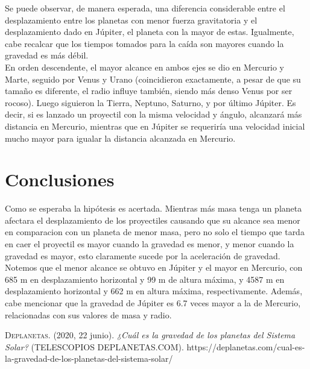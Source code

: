 \documentclass{article}
\begin{document}
Se puede observar, de manera esperada, una diferencia considerable entre el desplazamiento entre los planetas con menor fuerza gravitatoria y el desplazamiento dado en J\'upiter, el planeta con la mayor de estas. Igualmente, cabe recalcar que los tiempos tomados para la ca\'ida son mayores cuando la gravedad es m\'as d\'ebil.
\\
En orden descendente, el mayor alcance en ambos ejes se dio en Mercurio y Marte, seguido por Venus y Urano (coincidieron exactamente, a pesar de que su tamaño es diferente, el radio influye también, siendo más denso Venus por ser rocoso). Luego siguieron la Tierra, Neptuno, Saturno, y por último Júpiter. Es decir, si es lanzado un proyectil con la misma velocidad y ángulo, alcanzará más distancia en Mercurio, mientras que en Júpiter se requeriría una velocidad inicial mucho mayor para igualar la distancia alcanzada en Mercurio.

\section{Conclusiones}
Como se esperaba la hip\'otesis es acertada. Mientras más masa tenga un planeta afectara el desplazamiento de los proyectiles causando que su alcance sea menor en comparacion con un planeta de menor masa, pero no solo el tiempo que tarda en caer el proyectil es mayor cuando la gravedad es menor, y menor cuando la gravedad es mayor, esto claramente sucede por la aceleración de gravedad.\\
Notemos que el menor alcance se obtuvo en J\'upiter y el mayor en Mercurio, con 685 m en desplazamiento horizontal y 99 m de altura máxima, y 4587 m en desplazamiento horizontal y 662 m en altura m\'axima, respectivamente. Además, cabe mencionar que la gravedad de J\'upiter es 6.7 veces mayor a la de Mercurio, relacionadas con sus valores de masa y radio.

\begin{thebibliography}{X}
   \textsc{Deplanetas}. (2020, 22 junio).
\textit{¿Cuál es la gravedad de los planetas del Sistema Solar?} (TELESCOPIOS DEPLANETAS.COM). https://deplanetas.com/cual-es-la-gravedad-de-los-planetas-del-sistema-solar/
\end{thebibliography}
\end{document}
